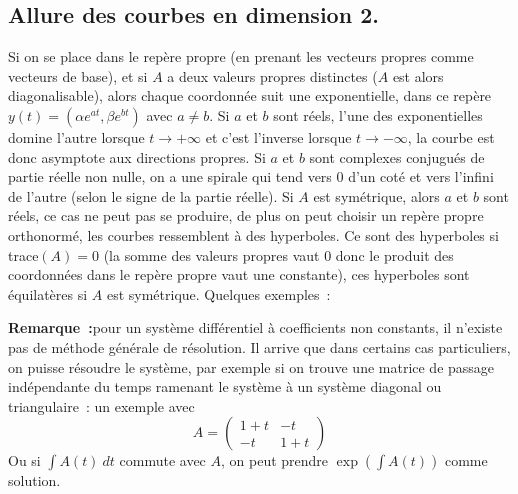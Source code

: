 \documentclass[a4paper,11pt]{book}
\begin{document}
\begin{giacjshere}
\subsection{Allure des courbes en dimension 2.}
Si on se place dans le rep\`ere propre (en prenant les vecteurs
propres comme vecteurs de base), et si $A$ a deux valeurs
propres distinctes ($A$ est alors diagonalisable),
alors chaque coordonn\'ee suit une exponentielle, dans ce rep\`ere
$y(t)=(\alpha e^{at}, \beta e^{bt})$ avec $a \neq b$. Si $a$ et $b$
sont r\'eels, l'une des exponentielles domine l'autre lorsque
$t\rightarrow +\infty$ et c'est l'inverse lorsque $t\rightarrow
-\infty$, la courbe est donc asymptote aux directions propres.
Si $a$ et $b$ sont complexes conjugu\'es de partie r\'eelle non nulle, 
on a une spirale qui
tend vers 0 d'un cot\'e et vers l'infini de l'autre (selon le signe
de la partie r\'eelle). Si $A$ est
sym\'etrique, alors $a$ et $b$ sont r\'eels, ce cas ne peut
pas se produire, de plus on peut choisir un rep\`ere propre
orthonorm\'e, les courbes ressemblent \`a des hyperboles.
Ce sont des hyperboles si trace$(A)=0$ (la somme des valeurs
propres vaut 0 donc le produit des coordonn\'ees dans
le rep\`ere propre vaut une constante),
ces hyperboles sont \'equilat\`eres si $A$ est sym\'etrique.
Quelques exemples~:

{\bf Remarque~:}pour un syst\`eme diff\'erentiel \`a coefficients
non constants, il n'existe pas de m\'ethode g\'en\'erale de
r\'esolution. Il arrive que dans certains cas particuliers,
on puisse r\'esoudre le syst\`eme, par exemple si on trouve
une matrice de passage ind\'ependante du temps ramenant
le syst\`eme \`a un syst\`eme diagonal ou triangulaire~:
un exemple avec
$$A=\left(\begin{array}{cc} 1+t & -t \\ -t & 1+t\end{array}\right)$$
Ou si $\int A(t) \ dt$ commute avec $A$, on peut prendre 
$\exp(\int A(t))$ comme solution.


\end{giacjshere}
\end{document}
